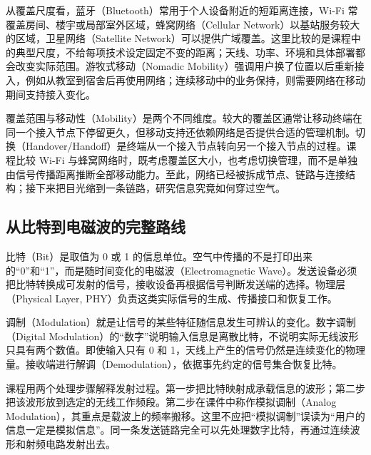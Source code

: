 从覆盖尺度看，蓝牙（Bluetooth）常用于个人设备附近的短距离连接，Wi-Fi 常覆盖房间、楼宇或局部室外区域，蜂窝网络（Cellular Network）以基站服务较大的区域，卫星网络（Satellite Network）可以提供广域覆盖。这里比较的是课程中的典型尺度，不给每项技术设定固定不变的距离；天线、功率、环境和具体部署都会改变实际范围。游牧式移动（Nomadic Mobility）强调用户换了位置以后重新接入，例如从教室到宿舍后再使用网络；连续移动中的业务保持，则需要网络在移动期间支持接入变化。

覆盖范围与移动性（Mobility）是两个不同维度。较大的覆盖区通常让移动终端在同一个接入节点下停留更久，但移动支持还依赖网络是否提供合适的管理机制。切换（Handover/Handoff）是终端从一个接入节点转向另一个接入节点的过程。课程比较 Wi-Fi 与蜂窝网络时，既考虑覆盖区大小，也考虑切换管理，而不是单独由信号传播距离推断全部移动能力。至此，网络已经被拆成节点、链路与连接结构；接下来把目光缩到一条链路，研究信息究竟如何穿过空气。

\subsection{从比特到电磁波的完整路线}
比特（Bit）是取值为 0 或 1 的信息单位。空气中传播的不是打印出来的“0”和“1”，而是随时间变化的电磁波（Electromagnetic Wave）。发送设备必须把比特转换成可发射的信号，接收设备再根据信号判断发送端的选择。物理层（Physical Layer, PHY）负责这类实际信号的生成、传播接口和恢复工作。

调制（Modulation）就是让信号的某些特征随信息发生可辨认的变化。数字调制（Digital Modulation）的“数字”说明输入信息是离散比特，不说明实际无线波形只具有两个数值。即使输入只有 0 和 1，天线上产生的信号仍然是连续变化的物理量。接收端进行解调（Demodulation），依据事先约定的信号集合恢复比特。

课程用两个处理步骤解释发射过程。第一步把比特映射成承载信息的波形；第二步把该波形放到选定的无线工作频段。第二步在课件中称作模拟调制（Analog Modulation），其重点是载波上的频率搬移。这里不应把“模拟调制”误读为“用户的信息一定是模拟信息”。同一条发送链路完全可以先处理数字比特，再通过连续波形和射频电路发射出去。

